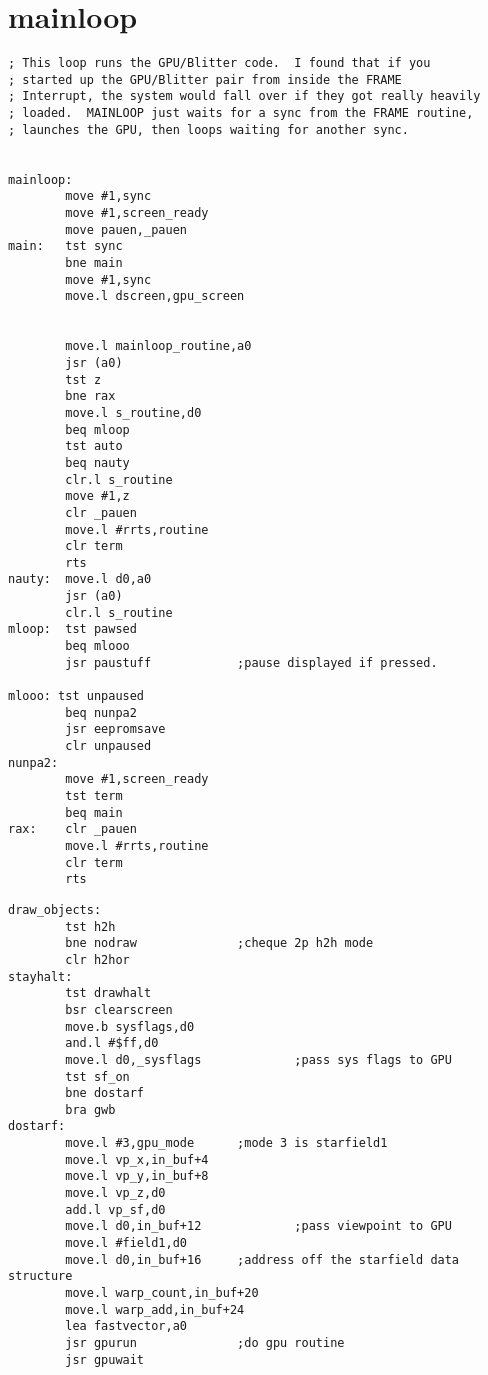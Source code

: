 \chapter{mainloop} 
\label{sec:listing}
\lstset{style=68KStyle}
\lhead[tempest 2000]{}

\begin{lstlisting}[escapechar=\%]
; This loop runs the GPU/Blitter code.  I found that if you
; started up the GPU/Blitter pair from inside the FRAME
; Interrupt, the system would fall over if they got really heavily
; loaded.  MAINLOOP just waits for a sync from the FRAME routine,
; launches the GPU, then loops waiting for another sync.


mainloop:
        move #1,sync
        move #1,screen_ready
        move pauen,_pauen
main:   tst sync
        bne main
        move #1,sync
        move.l dscreen,gpu_screen


        move.l mainloop_routine,a0
        jsr (a0)
        tst z
        bne rax
        move.l s_routine,d0
        beq mloop
        tst auto
        beq nauty
        clr.l s_routine
        move #1,z
        clr _pauen
        move.l #rrts,routine
        clr term
        rts
nauty:  move.l d0,a0
        jsr (a0)
        clr.l s_routine
mloop:  tst pawsed
        beq mlooo
        jsr paustuff            ;pause displayed if pressed.
        
mlooo: tst unpaused
        beq nunpa2
        jsr eepromsave
        clr unpaused    
nunpa2:
        move #1,screen_ready
        tst term
        beq main
rax:    clr _pauen
        move.l #rrts,routine
        clr term
        rts
\end{lstlisting}

\begin{lstlisting}[escapechar=\%]
draw_objects:
        tst h2h
        bne nodraw              ;cheque 2p h2h mode
        clr h2hor
stayhalt:
        tst drawhalt
        bsr clearscreen
        move.b sysflags,d0
        and.l #$ff,d0
        move.l d0,_sysflags             ;pass sys flags to GPU
        tst sf_on
        bne dostarf
        bra gwb
dostarf:
        move.l #3,gpu_mode      ;mode 3 is starfield1
        move.l vp_x,in_buf+4
        move.l vp_y,in_buf+8
        move.l vp_z,d0
        add.l vp_sf,d0
        move.l d0,in_buf+12             ;pass viewpoint to GPU
        move.l #field1,d0
        move.l d0,in_buf+16     ;address off the starfield data structure
        move.l warp_count,in_buf+20
        move.l warp_add,in_buf+24
        lea fastvector,a0
        jsr gpurun              ;do gpu routine
        jsr gpuwait
\end{lstlisting}

